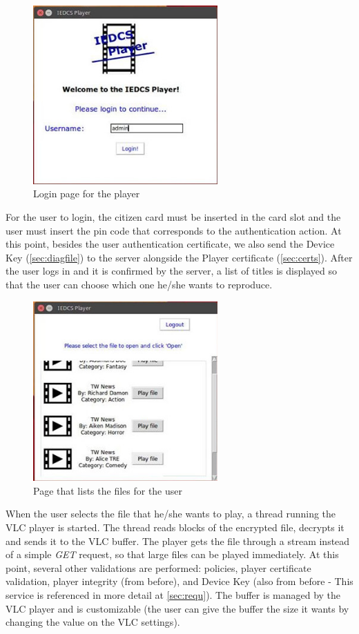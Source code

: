 \documentclass[11pt,a4paper]{report}
\begin{document}
\begin{figure}[H]
\centerline{\includegraphics[width=200pt]{images/playerLogin.jpg}}
\caption{Login page for the player}
\label{player}
\end{figure}

For the user to login, the citizen card must be inserted in the card slot and the user must insert the pin code that corresponds to the authentication action. At this point, besides the user authentication certificate, we also send the Device Key (\autoref{sec:diagfile}) to the server alongside the Player certificate (\autoref{sec:certs}).
\newline After the user logs in and it is confirmed by the server, a list of titles is displayed so that the user can choose which one he/she wants to reproduce.

\begin{figure}[H]
\centerline{\includegraphics[width=200pt]{images/playerList.jpg}}
\caption{Page that lists the files for the user}
\label{player}
\end{figure}

When the user selects the file that he/she wants to play, a thread running the VLC player is started. The thread reads blocks of the encrypted file, decrypts it and sends it to the VLC buffer.
The player gets the file through a stream instead of a simple \emph{GET} request, so that large files can be played immediately.
At this point, several other validations are performed: policies, player certificate validation, player integrity (from before), and Device Key (also from before - This service is referenced in more detail at \autoref{sec:requ}).
\newline
The buffer is managed by the VLC player and is customizable (the user can give the buffer the size it wants by changing the value on the VLC settings).
\end{document}
